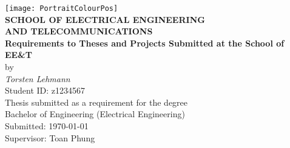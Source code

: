 \begin{center}
\texttt{[image: PortraitColourPos]}\\[0.5cm]
\textbf{\large SCHOOL OF ELECTRICAL ENGINEERING\\
AND TELECOMMUNICATIONS}\\[2cm]
{\addtolength{\baselineskip}{0.5cm}
\textbf{\Huge
Requirements to Theses and Projects Submitted at the School of EE\&T} \\[0.5cm]
}
{\Large by}\\[0.5cm]
\textit{\huge
Torsten Lehmann}\\[0.5cm]
{\Large
Student ID: z1234567}\\[1.5cm]
{\Large
Thesis submitted as a requirement for the degree\\
Bachelor of Engineering (Electrical Engineering)\\[2ex]
\vfill
Submitted: \today\\
Supervisor: Toan Phung
\vspace*{-1cm}
}
\end{center}

\begin{abstract}
This document describes the requirements to theses submitted for the
Bachelor of Engineering degree or coursework Masters degrees
at the School of Electrical Engineering and
Telecommunications.  Requirements described are that of both of context and
layout of the theses.  The document is written using the \LaTeX\ template
provided by the school.
\end{abstract}
